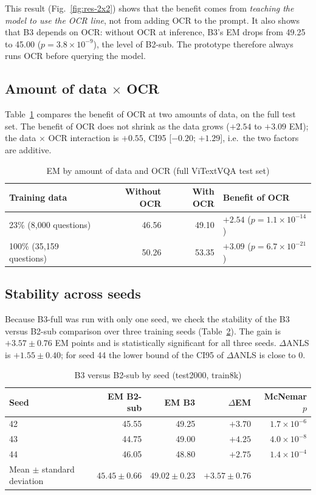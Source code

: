 This result (Fig.~\ref{fig:res-2x2}) shows that the benefit comes from \emph{teaching the
model to use the OCR line}, not from adding OCR to the prompt. It also shows that B3
depends on OCR: without OCR at inference, B3's EM drops from 49.25 to 45.00
($p = 3.8\times10^{-9}$), the level of B2-sub. The prototype therefore always runs OCR
before querying the model.

\subsection{Amount of data $\times$ OCR}

Table~\ref{tab:res-data} compares the benefit of OCR at two amounts of data, on the full
test set. The benefit of OCR does not shrink as the data grows ($+2.54$ to $+3.09$ EM); the
data $\times$ OCR interaction is $+0.55$, CI95 [$-0.20$; $+1.29$], i.e.\ the two factors
are additive.

\begin{table}[htbp]
\caption{EM by amount of data and OCR (full ViTextVQA test set)}
\label{tab:res-data}
\centering
\small
\begin{tabular}{lrrp{}}
\toprule
\textbf{Training data} & \textbf{Without OCR} & \textbf{With OCR} & \textbf{Benefit of OCR} \\
\midrule
23\% (8,000 questions) & 46.56 & 49.10 & $+2.54$ ($p = 1.1\times10^{-14}$) \\
100\% (35,159 questions) & 50.26 & 53.35 & $+3.09$ ($p = 6.7\times10^{-21}$) \\
\bottomrule
\end{tabular}
\end{table}

\subsection{Stability across seeds}

Because B3-full was run with only one seed, we check the stability of the B3 versus
B2-sub comparison over three training seeds (Table~\ref{tab:res-seed}). The gain is
$+3.57 \pm 0.76$ EM points and is statistically significant for all three seeds.
$\Delta$ANLS is $+1.55 \pm 0.40$; for seed 44 the lower bound of the CI95 of $\Delta$ANLS
is close to 0.

\begin{table}[htbp]
\caption{B3 versus B2-sub by seed (test2000, train8k)}
\label{tab:res-seed}
\centering
\small
\begin{tabular}{lrrrr}
\toprule
\textbf{Seed} & \textbf{EM B2-sub} & \textbf{EM B3} & \textbf{$\Delta$EM} & \textbf{McNemar $p$} \\
\midrule
42 & 45.55 & 49.25 & $+3.70$ & $1.7\times10^{-6}$ \\
43 & 44.75 & 49.00 & $+4.25$ & $4.0\times10^{-8}$ \\
44 & 46.05 & 48.80 & $+2.75$ & $1.4\times10^{-4}$ \\
\midrule
Mean $\pm$ standard deviation & $45.45 \pm 0.66$ & $49.02 \pm 0.23$ & $+3.57 \pm 0.76$ & \\
\bottomrule
\end{tabular}
\end{table}

